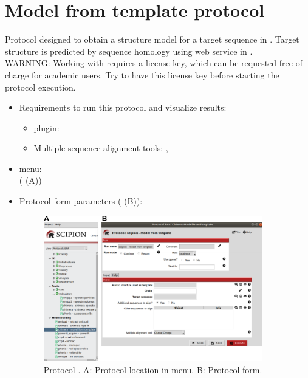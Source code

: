 \section{Model from template protocol}
\label{app:modelFromTemplate}%
Protocol designed to obtain a structure model for a target sequence in \scipion. Target structure is predicted by sequence homology using \modeller \citep{sali1993} web service in \chimera.\\
WARNING: Working with \modeller requires a license key, which can be requested free of charge for academic users. Try to have this license key before starting the protocol execution.\\ 

   
 \begin{itemize}
  \item Requirements to run this protocol and visualize results:
    \begin{itemize}
        \item \scipion plugin: 
        \item Multiple sequence alignment tools: , 
    \end{itemize}
  \item \scipion menu:\\
   ( (A))\\
  
  \item Protocol form parameters ( (B)):\\
  
  \begin{figure}[H]
    \centering 
    \captionsetup{width=.7\linewidth} 
    \includegraphics[width=0.90\textwidth]{Images_appendix/Fig111.pdf}
    \caption{Protocol . A: Protocol location in \scipion menu. B: Protocol form.}
    \label{fig:app_protocol_seqHomology_1}
   \end{figure}
  

\end{itemize}
